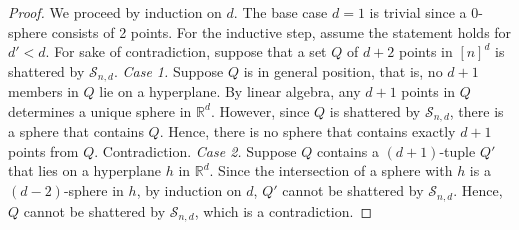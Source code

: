 %
\begin{proof}
We proceed by induction on $d$.  The base case $d = 1$ is trivial since a 0-sphere consists of 2 points.  For the inductive step, assume the statement holds for $d' < d$.  For sake of contradiction, suppose that a set $Q$ of $d+2$ points in $[n]^d$ is shattered by $\mathcal{S}_{n,d}$. 
%
\medskip
%
%
\noindent \emph{Case 1.}  Suppose $Q$ is in general position, that is, no $d+1$ members in $Q$ lie on a hyperplane.  By linear algebra, any $d+1$ points in $Q$ determines a unique sphere in $\mathbb{R}^d$. 
 However, since $Q$ is shattered by $\mathcal{S}_{n,d}$, there is a sphere that contains $Q$.  Hence, there is no sphere that contains exactly $d + 1$ points from $Q$.  Contradiction.
%
 \medskip
\noindent \emph{Case 2.}  Suppose $Q$ contains a $(d+1)$-tuple $Q'$ that lies on a hyperplane $h$ in $\mathbb{R}^d$.  Since the intersection of a sphere with $h$ is a $(d-2)$-sphere in $h$, by induction on $d$, $Q'$ cannot be shattered by $\mathcal{S}_{n,d}$.  Hence, $Q$ cannot be shattered by  $\mathcal{S}_{n,d}$, which is a contradiction. \end{proof}
%
%
%
%
%
%
%
